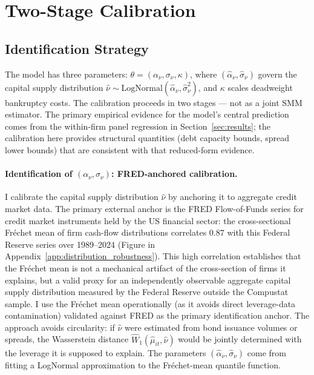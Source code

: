 \section{Two-Stage Calibration}
\label{sec:estimation}

\subsection{Identification Strategy}

The model has three parameters: $\theta = (\alpha_\nu, \sigma_\nu, \kappa)$, where $(\hat{\alpha}_\nu, \hat{\sigma}_\nu)$ govern the capital supply distribution $\hat{\nu} \sim \text{LogNormal}(\hat{\alpha}_\nu, \hat{\sigma}_\nu^2)$, and $\kappa$ scales deadweight bankruptcy costs. The calibration proceeds in two stages — not as a joint SMM estimator. The primary empirical evidence for the model's central prediction comes from the within-firm panel regression in Section~\ref{sec:results}; the calibration here provides structural quantities (debt capacity bounds, spread lower bounds) that are consistent with that reduced-form evidence.

\paragraph{Identification of $(\alpha_\nu, \sigma_\nu)$: FRED-anchored calibration.}
I calibrate the capital supply distribution $\hat{\nu}$ by anchoring it to aggregate credit market data. The primary external anchor is the FRED Flow-of-Funds series for credit market instruments held by the US financial sector: the cross-sectional Fr\'{e}chet mean of firm cash-flow distributions correlates $0.87$ with this Federal Reserve series over 1989--2024 (Figure in Appendix~\ref{app:distribution_robustness}). This high correlation establishes that the Fr\'{e}chet mean is not a mechanical artifact of the cross-section of firms it explains, but a valid proxy for an independently observable aggregate capital supply distribution measured by the Federal Reserve outside the Compustat sample. I use the Fréchet mean operationally (as it avoids direct leverage-data contamination) validated against FRED as the primary identification anchor. The approach avoids circularity: if $\hat{\nu}$ were estimated from bond issuance volumes or spreads, the Wasserstein distance $\widehat{W}_1(\hat{\mu}_{it}, \hat{\nu})$ would be jointly determined with the leverage it is supposed to explain. The parameters $(\hat{\alpha}_\nu, \hat{\sigma}_\nu)$ come from fitting a LogNormal approximation to the Fr\'{e}chet-mean quantile function.

